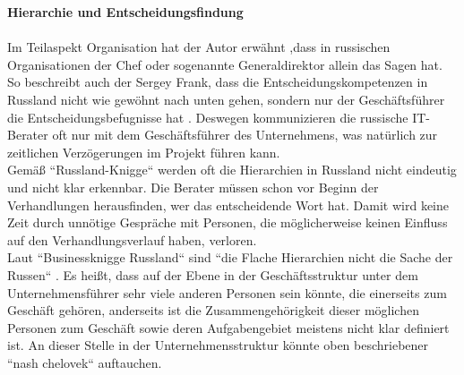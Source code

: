 	 	 \textbf{Hierarchie und Entscheidungsfindung}\\
	 	 \\
	 Im Teilaspekt Organisation hat der Autor erwähnt ,dass in russischen Organisationen der Chef oder sogenannte Generaldirektor  allein das Sagen hat. So beschreibt auch der Sergey Frank, dass die Entscheidungskompetenzen in Russland nicht wie gewöhnt nach unten gehen, sondern nur der Geschäftsführer die Entscheidungsbefugnisse hat \cite{RuSFI}.
	 Deswegen kommunizieren die russische IT-Berater oft nur mit dem Geschäftsführer des Unternehmens, was natürlich zur zeitlichen Verzögerungen im Projekt führen kann.\\
	 Gemäß ``Russland-Knigge`` \cite{RusKnigge} werden oft die Hierarchien in Russland nicht eindeutig und nicht klar erkennbar. Die Berater müssen schon vor Beginn der Verhandlungen herausfinden, wer das entscheidende Wort hat. Damit wird keine Zeit durch unnötige Gespräche mit Personen, die möglicherweise keinen Einfluss auf den Verhandlungsverlauf haben, verloren.\\
	 Laut ``Businessknigge Russland`` sind ``die Flache Hierarchien nicht die Sache der Russen`` \cite{RusKnigge}. Es heißt, dass auf der Ebene in der Geschäftsstruktur unter dem Unternehmensführer  sehr viele anderen Personen sein könnte, die einerseits zum Geschäft gehören, anderseits ist die Zusammengehörigkeit dieser möglichen Personen zum Geschäft sowie deren Aufgabengebiet meistens nicht klar definiert ist. An dieser Stelle in der Unternehmensstruktur könnte oben beschriebener ``nash chelovek`` auftauchen.
	
